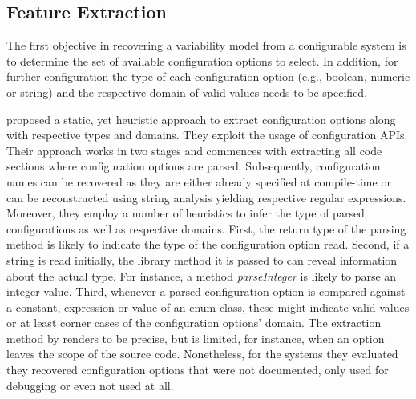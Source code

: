 \subsection{Feature Extraction} 
The first objective in recovering a variability model from a configurable
system is to determine the set of available configuration options to select. In
addition, for further configuration the type of each configuration option
(e.g., boolean, numeric or string) and the respective domain of valid values
needs to be specified.

\cite{rabkin_static_2011} proposed a static, yet heuristic approach to extract
configuration options along with respective types and domains. They exploit the
usage of configuration APIs. Their approach works
in two stages and commences with extracting all code sections where
configuration options are parsed. Subsequently, configuration names can be
recovered as they are either already specified at compile-time or can be
reconstructed using string analysis yielding respective regular expressions.
Moreover, they employ a number of heuristics to infer the type of parsed
configurations as well as respective domains. First, the return type of the
parsing method is likely to indicate the type of the configuration option read.
Second, if a string is read initially, the library method it is passed to can
reveal information about the actual type. For instance, a method
\emph{parseInteger} is likely to parse an integer value. Third, whenever a
parsed configuration option is compared against a constant, expression or value of an enum class,
these might indicate valid values or at least corner cases of the configuration
options' domain. The extraction method by \cite{rabkin_static_2011} renders to be precise, but is
limited, for instance, when an option leaves the scope of the source code.
Nonetheless, for the systems they evaluated they recovered configuration
options that were not documented, only used for debugging or even not used at
all.


